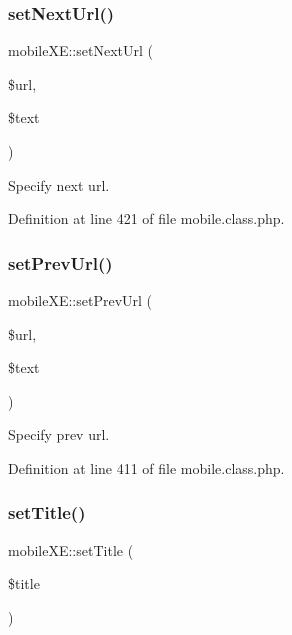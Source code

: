 \subsubsection{\texorpdfstring{set\+Next\+Url()}{setNextUrl()}}
{\footnotesize\ttfamily mobile\+X\+E\+::set\+Next\+Url (\begin{DoxyParamCaption}\item[{}]{\$url,  }\item[{}]{\$text }\end{DoxyParamCaption})}



Specify next url. 



Definition at line 421 of file mobile.\+class.\+php.

\hypertarget{classmobileXE_ad5d56a0b6158ecf599359ca2f1356f16}{}\label{classmobileXE_ad5d56a0b6158ecf599359ca2f1356f16} 
\subsubsection{\texorpdfstring{set\+Prev\+Url()}{setPrevUrl()}}
{\footnotesize\ttfamily mobile\+X\+E\+::set\+Prev\+Url (\begin{DoxyParamCaption}\item[{}]{\$url,  }\item[{}]{\$text }\end{DoxyParamCaption})}



Specify prev url. 



Definition at line 411 of file mobile.\+class.\+php.

\hypertarget{classmobileXE_a6ae064d89d2b926d7c96f59257692a01}{}\label{classmobileXE_a6ae064d89d2b926d7c96f59257692a01} 
\subsubsection{\texorpdfstring{set\+Title()}{setTitle()}}
{\footnotesize\ttfamily mobile\+X\+E\+::set\+Title (\begin{DoxyParamCaption}\item[{}]{\$title }\end{DoxyParamCaption})}



